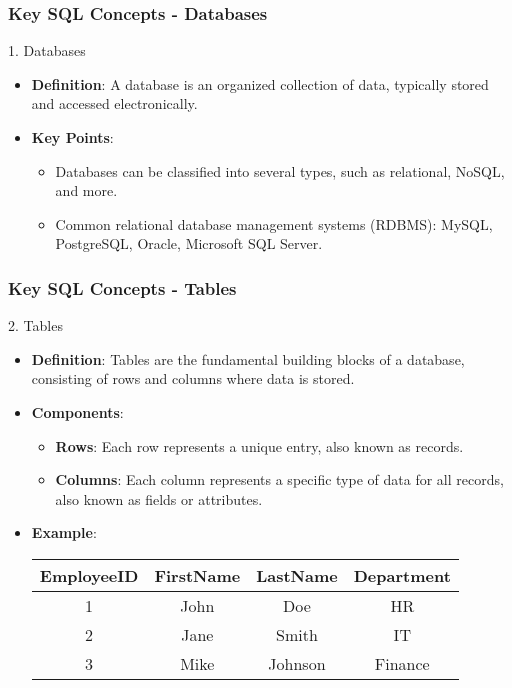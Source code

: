 \documentclass{beamer}
\begin{document}
\begin{frame}[fragile]
    \frametitle{Key SQL Concepts - Databases}
    \begin{block}{1. Databases}
        \begin{itemize}
            \item \textbf{Definition}: A database is an organized collection of data, typically stored and accessed electronically.
            \item \textbf{Key Points}:
            \begin{itemize}
                \item Databases can be classified into several types, such as relational, NoSQL, and more.
                \item Common relational database management systems (RDBMS): MySQL, PostgreSQL, Oracle, Microsoft SQL Server.
            \end{itemize}
        \end{itemize}
    \end{block}
\end{frame}

\begin{frame}[fragile]
    \frametitle{Key SQL Concepts - Tables}
    \begin{block}{2. Tables}
        \begin{itemize}
            \item \textbf{Definition}: Tables are the fundamental building blocks of a database, consisting of rows and columns where data is stored.
            \item \textbf{Components}:
            \begin{itemize}
                \item \textbf{Rows}: Each row represents a unique entry, also known as records.
                \item \textbf{Columns}: Each column represents a specific type of data for all records, also known as fields or attributes.
            \end{itemize}
            \item \textbf{Example}:
            \begin{center}
            \begin{tabular}{|c|c|c|c|}
                \hline
                EmployeeID & FirstName & LastName & Department \\
                \hline
                1          & John      & Doe      & HR         \\
                2          & Jane      & Smith    & IT         \\
                3          & Mike      & Johnson  & Finance    \\
                \hline
            \end{tabular}
            \end{center}
        \end{itemize}
    \end{block}
\end{frame}
\end{document}
